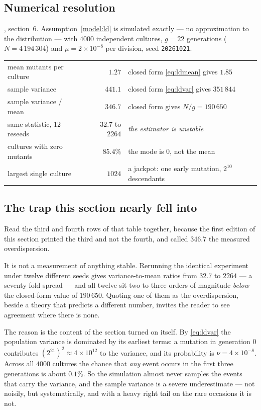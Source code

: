 \subsection{Numerical resolution}

\begin{numerics}[6.1]
, section~6. Assumption~\ref{model:ld} is
simulated exactly --- no approximation to the distribution --- with
$4000$ independent cultures, $g = 22$ generations ($N = 4\,194\,304$) and
$\mu = 2\times10^{-8}$ per division, seed \texttt{20261021}.

\medskip
\begin{tabularx}{\linewidth}{@{}l r X@{}}
\toprule
mean mutants per culture & $1.27$ & closed form \eqref{eq:ldmean} gives $1.85$ \\
sample variance & $441.1$ & closed form \eqref{eq:ldvar} gives $351\,844$ \\
sample variance / mean & $346.7$ & closed form gives $N/g = 190\,650$ \\
same statistic, $12$ reseeds & $32.7$ to $2264$ & \emph{the estimator is unstable} \\
cultures with zero mutants & $85.4\%$ & the mode is $0$, not the mean \\
largest single culture & $1024$ & a jackpot: one early mutation, $2^{10}$ descendants \\
\bottomrule
\end{tabularx}
\end{numerics}

\subsection{The trap this section nearly fell into}\label{sub:trap}

Read the third and fourth rows of that table together, because the first edition
of this section printed the third and not the fourth, and called $346.7$ the
measured overdispersion.

It is not a measurement of anything stable. Rerunning the identical experiment
under twelve different seeds gives variance-to-mean ratios from $32.7$ to
$2264$ --- a seventy-fold spread --- and all twelve sit two to three orders of
magnitude \emph{below} the closed-form value of $190\,650$. Quoting one of them
as the overdispersion, beside a theory that predicts a different number, invites
the reader to see agreement where there is none.

The reason is the content of the section turned on itself. By \eqref{eq:ldvar}
the population variance is dominated by its earliest terms: a mutation in
generation $0$ contributes $(2^{21})^2 \approx 4\times10^{12}$ to the variance,
and its probability is $\nu = 4\times10^{-8}$. Across all $4000$ cultures the
chance that \emph{any} event occurs in the first three generations is about
$0.1\%$. So the simulation almost never samples the events that carry the
variance, and the sample variance is a severe underestimate --- not noisily, but
systematically, and with a heavy right tail on the rare occasions it is not.

